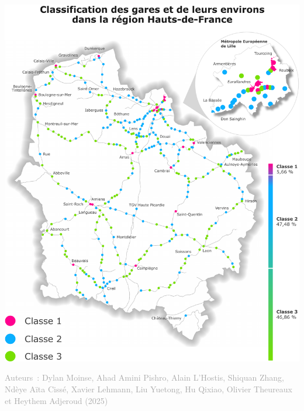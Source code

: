 \documentclass[../main.tex]{subfiles}
\begin{document}
\begin{multicols}{2}
\begin{center}
    \includegraphics[width=\columnwidth]{figures/policy-brief-carte-classification-compresse.pdf}
    \label{classification-npart}
    \vspace{-0.2cm}
    \begin{flushright}
        \begin{minipage}{1\linewidth}
            \justifying
            \noindent
            \scriptsize{\textcolor{darkgray}{Auteurs~: Dylan Moinse, Ahad Amini Pishro, Alain L'Hostis, Shiquan Zhang, Ndèye Aïta Cissé, Xavier Lehmann, Liu Yuetong, Hu Qixiao, Olivier Theureaux et Heythem Adjeroud (2025)}}
        \end{minipage}
    \end{flushright}
\end{center}

    \end{multicols}

    
\end{document}
